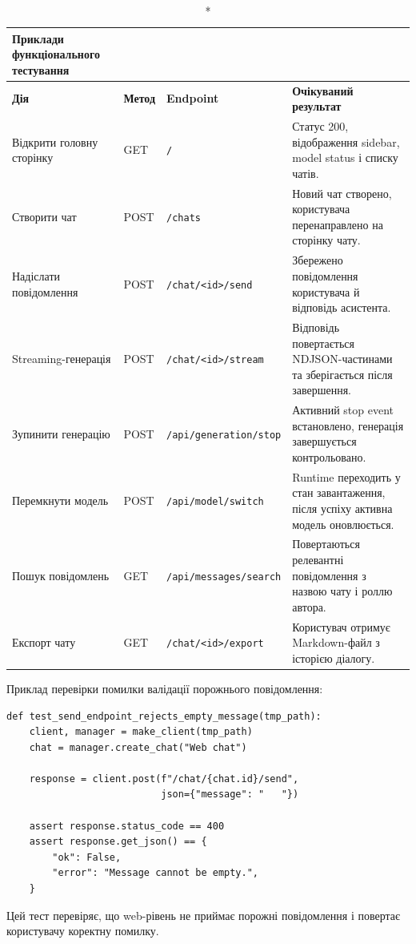 \begin{longtable}{|p{3.5cm}|p{2cm}|p{4.8cm}|p{4cm}|}
\caption*{Приклади функціонального тестування}\\
\hline
\textbf{Дія} & \textbf{Метод} & \textbf{Endpoint} & \textbf{Очікуваний результат} \\
\hline
Відкрити головну сторінку & GET & \texttt{/} & Статус 200, відображення sidebar, model status і списку чатів. \\
\hline
Створити чат & POST & \texttt{/chats} & Новий чат створено, користувача перенаправлено на сторінку чату. \\
\hline
Надіслати повідомлення & POST & \texttt{/chat/<id>/send} & Збережено повідомлення користувача й відповідь асистента. \\
\hline
Streaming-генерація & POST & \texttt{/chat/<id>/stream} & Відповідь повертається NDJSON-частинами та зберігається після завершення. \\
\hline
Зупинити генерацію & POST & \texttt{/api/generation/stop} & Активний stop event встановлено, генерація завершується контрольовано. \\
\hline
Перемкнути модель & POST & \texttt{/api/model/switch} & Runtime переходить у стан завантаження, після успіху активна модель оновлюється. \\
\hline
Пошук повідомлень & GET & \texttt{/api/messages/search} & Повертаються релевантні повідомлення з назвою чату і роллю автора. \\
\hline
Експорт чату & GET & \texttt{/chat/<id>/export} & Користувач отримує Markdown-файл з історією діалогу. \\
\hline
\end{longtable}

Приклад перевірки помилки валідації порожнього повідомлення:

\begin{lstlisting}[style=plantumlstyle]
def test_send_endpoint_rejects_empty_message(tmp_path):
    client, manager = make_client(tmp_path)
    chat = manager.create_chat("Web chat")

    response = client.post(f"/chat/{chat.id}/send",
                           json={"message": "   "})

    assert response.status_code == 400
    assert response.get_json() == {
        "ok": False,
        "error": "Message cannot be empty.",
    }
\end{lstlisting}

Цей тест перевіряє, що web-рівень не приймає порожні повідомлення і повертає користувачу коректну помилку.
